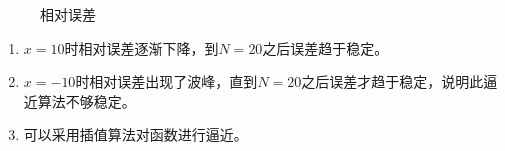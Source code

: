 \begin{figure}[htbp]
    \centering
    \caption{相对误差}
\end{figure}
\begin{enumerate}
    \item $x=10$时相对误差逐渐下降，到$N=20$之后误差趋于稳定。
    \item $x=-10$时相对误差出现了波峰，直到$N=20$之后误差才趋于稳定，说明此逼近算法不够稳定。
    \item 可以采用插值算法对函数进行逼近。
\end{enumerate}

